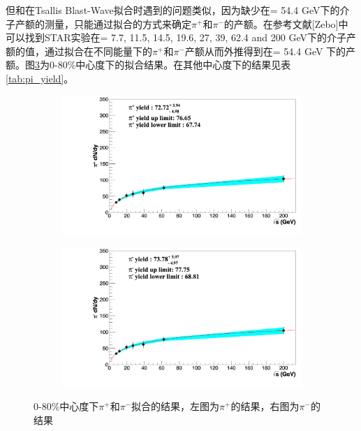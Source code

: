 但和在Tsallis Blast-Wave拟合时遇到的问题类似，因为缺少在\sNN = 54.4 GeV下的介子产额的测量，只能通过拟合的方式来确定$\pi^+$和$\pi^-$的产额。在参考文献[Zebo]中可以找到STAR实验在\sNN = 7.7, 11.5, 14.5, 19.6, 27, 39, 62.4 and 200 GeV下的介子产额的值，通过拟合在不同能量下的$\pi^+$和$\pi^-$产额从而外推得到在\sNN = 54.4 GeV 下的产额。图\ref{fig:pi_yield}为0-80\%中心度下的拟合结果。在其他中心度下的结果见表\ref{tab:pi_yield}。
\begin{figure}[htb]
    \centering
    \begin{subfigure}[b]{0.45\textwidth}
        \centering
        \includegraphics[width=\textwidth,clip]{figures/Chapter4/080_Plus_Yield.png}
        \caption{}
        \label{fig:pi_plus_yield}
    \end{subfigure}
    \hfill
    \begin{subfigure}[b]{0.45\textwidth}
        \centering
        \includegraphics[width=\textwidth,clip]{figures/Chapter4/080_Minus_Yield.png}
        \caption{}
        \label{fig:pi_minus_yield}
    \end{subfigure}
    \caption[0-80\%中心度下$\pi^+$和$\pi^-$拟合的结果]{0-80\%中心度下$\pi^+$和$\pi^-$拟合的结果，左图为$\pi^+$的结果，右图为$\pi^-$的结果}
    \label{fig:pi_yield}
\end{figure}
